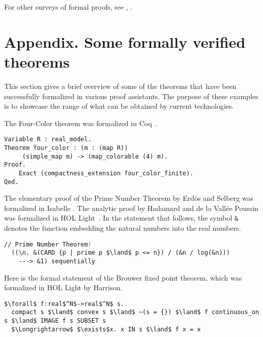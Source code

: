 \documentclass[brochure,english,12pt]{bourbaki}
\theoremstyle{plain}
\begin{document}
For other surveys of formal proofs, see \cite{avigad2014formally},
\cite{Hales:2008:formal}.

\section{Appendix. Some formally verified theorems}


This section gives a brief overview of some of the theorems that have
been successfully formalized in various proof assistants.  The purpose
of these examples is to showcase the range of what can be obtained by
current technologies.


The Four-Color theorem was formalized in Coq~\cite{gonthier2008formal}.



\begin{lstlisting}[keepspaces=true,stringstyle=\tt,basicstyle=\small,frame=single,framesep=8pt,morekeywords={Variable,Theorem,Proof,Qed},columns=flexible]
Variable R : real_model. 
Theorem four_color : (m : (map R))
     (simple_map m) -> (map_colorable (4) m). 
Proof.
    Exact (compactness_extension four_color_finite). 
Qed.
\end{lstlisting}


The elementary proof of the Prime Number Theorem by Erd\"os and
Selberg was formalized in Isabelle \cite{avigad2007formally}.  The
analytic proof by Hadamard and de la Vall\'ee Poussin was formalized
in HOL Light~\cite{harrison2009formalizing}. In the statement that
follows, the symbol \verb!&! denotes the function embedding the
natural numbers into the real numbers.

\begin{lstlisting}[keepspaces=true,stringstyle=\tt,basicstyle=\small,frame=single,framesep=8pt,mathescape,morekeywords={},columns=flexible]
  // Prime Number Theorem:
  ((\n. &(CARD {p | prime p $\land$ p <= n}) / (&n / log(&n)))
    ---> &1) sequentially
\end{lstlisting}

Here is the formal statement of the Brouwer fixed point theorem, which was formalized in HOL Light by Harrison.

\begin{lstlisting}[keepspaces=true,stringstyle=\tt,basicstyle=\small,frame=single,framesep=8pt,mathescape,morekeywords={},columns=flexible]
  $\forall$ f:real$^N$->real$^N$ s. 
  compact s $\land$ convex s $\land$ ~(s = {}) $\land$ f continuous_on s $\land$ IMAGE f s SUBSET s
  $\Longrightarrow$ $\exists$x. x IN s $\land$ f x = x
\end{lstlisting}
\end{document}

